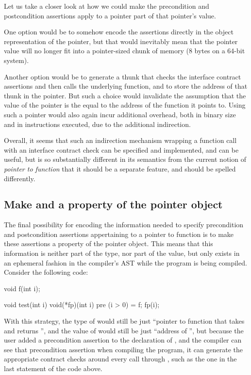Let us take a closer look at how we could make the precondition and postcondition assertions apply to a pointer part of that pointer's value.

One option would be to somehow encode the assertions directly in the object representation of the pointer, but that would inevitably mean that the pointer value will no longer fit into a pointer-sized chunk of memory (8 bytes on a 64-bit system).

Another option would be to generate a thunk that checks the interface contract assertions and then calls the underlying function, and to store the address of that thunk in the pointer. But such a choice would invalidate the assumption that the value of the pointer is the equal to the address of the function it points to. Using such a pointer would also again incur additional overhead, both in binary size and in instructions executed, due to the additional indirection.

Overall, it seems that such an indirection mechanism wrapping a function call with an interface contract check can be specified and implemented, and can be useful, but is so substantially different in its semantics from the current notion of \emph{pointer to function} that it should be a separate feature, and should be spelled differently.

\subsection{Make  and  a property of the pointer object}

The final possibility for encoding the information needed to specify precondition and postcondition assertions appertaining to a pointer to function is to make these assertions a property of the pointer object. This means that this information is neither part of the type, nor part of the value, but only exists in an ephemeral fashion in the compiler's AST while the program is being compiled. Consider the following code:
\begin{codeblock}
void f(int i);

void test(int i) {
  void(*fp)(int i) pre (i > 0) = f;
  fp(i);
}
\end{codeblock}
With this strategy, the type of  would still be just ``pointer to function that takes  and returns '', and the value of  would still be just ``address of '', but because the user added a precondition assertion to the declaration of , and the compiler can see that precondition assertion when compiling the program, it can generate the appropriate contract checks around every call through , such as the one in the last statement of the code above.

